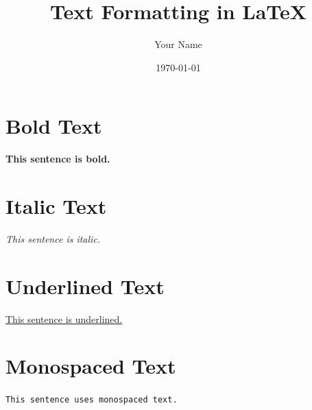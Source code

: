 \documentclass{article}
\title{Text Formatting in LaTeX}
\author{Your Name}
\date{\today}
\begin{document}
\maketitle

\section{Bold Text}
\textbf{This sentence is bold.}

\section{Italic Text}
\textit{This sentence is italic.}

\section{Underlined Text}
\underline{This sentence is underlined.}

\section{Monospaced Text}
\texttt{This sentence uses monospaced text.}
\end{document}
